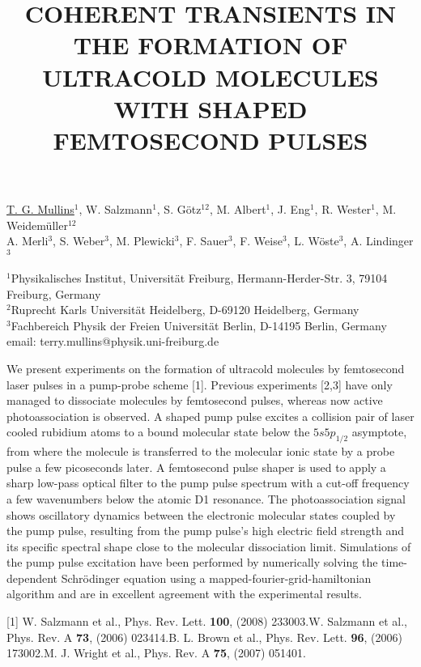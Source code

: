 \title{COHERENT TRANSIENTS IN THE FORMATION OF ULTRACOLD MOLECULES WITH SHAPED FEMTOSECOND PULSES}

\underline{T. G. Mullins}$^1$, W. Salzmann$^1$, S. G\"{o}tz$^{12}$, M. Albert$^1$, J. Eng$^1$, R. Wester$^1$, M. Weidem\"{u}ller$^{12}$\\
A. Merli$^3$, S. Weber$^3$, M. Plewicki$^3$, F. Sauer$^3$, F. Weise$^3$, L. W\"{o}ste$^3$, A. Lindinger$^3$



$^1$Physikalisches Institut,
Universit\"{a}t Freiburg,
Hermann-Herder-Str. 3,
79104 Freiburg,
Germany\\
$^2$Ruprecht Karls Universit\"{a}t Heidelberg, D-69120 Heidelberg, Germany\\
$^3$Fachbereich Physik der Freien Universit\"{a}t Berlin, D-14195 Berlin, Germany\\
email: terry.mullins@physik.uni-freiburg.de

We present experiments on the formation of ultracold molecules by femtosecond laser pulses in a pump-probe scheme [1]. Previous experiments [2,3] have only managed to dissociate molecules by femtosecond pulses, whereas now active photoassociation is observed. A shaped pump pulse excites a collision pair of laser cooled rubidium atoms to a bound molecular state below the $5s5p_{1/2}$ asymptote, from where the molecule is transferred to the molecular ionic state by a probe pulse a few picoseconds later. A femtosecond pulse shaper is used to apply a sharp low-pass optical filter to the pump pulse spectrum with a cut-off frequency a few wavenumbers below the atomic D1 resonance. The photoassociation signal shows oscillatory dynamics between the electronic molecular states coupled by the pump pulse, resulting from the pump pulse's high electric field strength and its specific spectral shape close to the molecular dissociation limit. Simulations of the pump pulse excitation have been performed by numerically solving the time-dependent Schr\"{o}dinger equation using a mapped-fourier-grid-hamiltonian algorithm and are in excellent agreement with the experimental results.

[1] W. Salzmann et al., Phys. Rev. Lett. \textbf{100}, (2008) 233003.\newline
[2] W. Salzmann et al., Phys. Rev. A \textbf{73}, (2006) 023414.\newline
[3] B. L. Brown et al., Phys. Rev. Lett. \textbf{96}, (2006) 173002.\newline
[4] M. J. Wright et al., Phys. Rev. A \textbf{75}, (2007) 051401.

\vspace{\baselineskip}